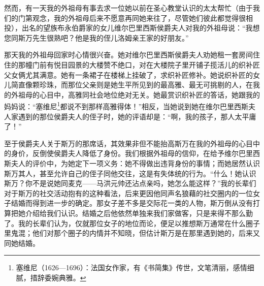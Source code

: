 \par 然而，有一天我的外祖母有事去求一位她以前在圣心教堂认识的太太帮忙（由于我们的门第观念，我的外祖母后来不愿意再同她来往了，尽管她们彼此都觉得很相投），出名的望族布永伯爵家的女儿维尔巴里西斯侯爵夫人对我的外祖母说：“我想您同斯万先生很熟吧？他是我的侄儿洛姆亲王家的好朋友。”
\par 那天我的外祖母回家时心情很兴奋。她对维尔巴里西斯侯爵夫人劝她租一套房间住住的那幢门前有悦目园景的大楼赞不绝口，对在大楼院子里开铺子揽活儿的织补匠父女俩尤其满意。她有一条裙子在楼梯上挂破了，求织补匠修补。她说织补匠的女儿简直像颗珍珠，而那位父亲则是她生平所见到的最高雅、最无可挑剔的人，在我的外祖母的心目中，高雅同社会地位绝对无关。她最赏识织补匠的答话，她跟我的妈妈说：“塞维尼\footnote{塞维尼（1626—1696）：法国女作家，有《书简集》传世，文笔清丽，感情细腻，措辞委婉典雅。}都说不到那样高雅得体！”相反，当她说到她在维尔巴里西斯夫人家遇到的那位侯爵夫人的侄子时，她的评语却是：“啊，我的孩子，那人太平庸了！”
\par 至于侯爵夫人关于斯万的那席话，其效果非但不能抬高斯万在我的外祖母的心目中的身价，反倒使侯爵夫人降低了身份。我们根据外祖母的信仰，在给予维尔巴里西斯夫人的评价中，为她定下一项义务：她不得做出违背身份的事情；而她居然认识斯万其人，甚至允许自己的侄子同他交往，这是有失体统的行为。“什么！她认识斯万？你不是说她同麦克——马洪元帅还沾点亲吗，她怎么能这样？”我的长辈们对于斯万的社交活动抱有的这种看法，后来更因他同声名狼藉的社交圈内的一位女子结婚而得到进一步的确定。那女子差不多是交际花一类的人物，斯万倒从没有打算把她介绍给我们认识。结婚之后他依然单独来我们家做客，只是来得不那么勤了。我的长辈们认为，仅就那位女子的地位而论，便足以推想斯万通常在什么圈子里鬼混；他们对那个圈子的内情并不知晓，但估计斯万是在那里遇到她的，后来又同她结婚。
